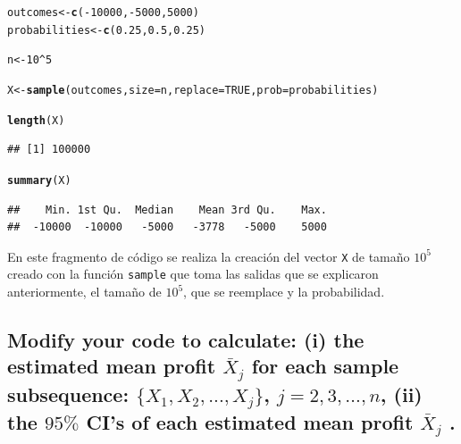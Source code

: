 \documentclass[12pt]{article}\usepackage[]{graphicx}\usepackage[]{xcolor}
\makeatletter
\newcommand{\hlnum}[1]{\textcolor[rgb]{0.686,0.059,0.569}{#1}}%
\newcommand{\hlopt}[1]{\textcolor[rgb]{0,0,0}{#1}}%
\newcommand{\hldef}[1]{\textcolor[rgb]{0.345,0.345,0.345}{#1}}%
\newcommand{\hlkwb}[1]{\textcolor[rgb]{0.69,0.353,0.396}{#1}}%
\newcommand{\hlkwc}[1]{\textcolor[rgb]{0.333,0.667,0.333}{#1}}%
\newcommand{\hlkwd}[1]{\textcolor[rgb]{0.737,0.353,0.396}{\textbf{#1}}}%
\newenvironment{kframe}{%
 \def\at@end@of@kframe{}%
 \ifinner\ifhmode%
  \def\at@end@of@kframe{\end{minipage}}%
  \begin{minipage}{\columnwidth}%
 \fi\fi%
 \def\FrameCommand##1{\hskip\@totalleftmargin \hskip-\fboxsep
 \colorbox{shadecolor}{##1}\hskip-\fboxsep
     \hskip-\linewidth \hskip-\@totalleftmargin \hskip\columnwidth}%
 \MakeFramed {\advance\hsize-\width
   \@totalleftmargin\z@ \linewidth\hsize
   \@setminipage}}%
 {\par\unskip\endMakeFramed%
 \at@end@of@kframe}
\newenvironment{knitrout}{}{} %
\makeatother
\begin{document}
\begin{knitrout}
\color{fgcolor}\begin{kframe}
\begin{alltt}
\hldef{outcomes} \hlkwb{<-} \hlkwd{c}\hldef{(}\hlopt{-}\hlnum{10000}\hldef{,} \hlopt{-}\hlnum{5000}\hldef{,} \hlnum{5000}\hldef{)}
\hldef{probabilities} \hlkwb{<-} \hlkwd{c}\hldef{(}\hlnum{0.25}\hldef{,} \hlnum{0.5}\hldef{,} \hlnum{0.25}\hldef{)}

\hldef{n} \hlkwb{<-} \hlnum{10}\hlopt{^}\hlnum{5}

\hldef{X} \hlkwb{<-} \hlkwd{sample}\hldef{(outcomes,} \hlkwc{size} \hldef{= n ,} \hlkwc{replace} \hldef{=} \hlnum{TRUE}\hldef{,} \hlkwc{prob} \hldef{= probabilities)}

\hlkwd{length}\hldef{(X)}
\end{alltt}
\begin{verbatim}
## [1] 100000
\end{verbatim}
\begin{alltt}
\hlkwd{summary}\hldef{(X)}
\end{alltt}
\begin{verbatim}
##    Min. 1st Qu.  Median    Mean 3rd Qu.    Max. 
##  -10000  -10000   -5000   -3778   -5000    5000
\end{verbatim}
\end{kframe}
\end{knitrout}

En este fragmento de código se realiza la creación del vector \lstinline|X| de tamaño $10^{5}$ creado con la función \lstinline|sample| que toma las salidas que se explicaron anteriormente, el tamaño de $10^{5}$, que se reemplace y la probabilidad.


\subsection{Modify your code to calculate: (i) the estimated mean profit $\bar{X}_{j}$ for each sample subsequence: $\{X_{1}, X_{2}, . . . , X_{j} \}$, $j = 2, 3, \dots, n$, (ii) the $95 \%$ CI’s of each estimated mean profit $\bar{X}_{j}$ .}
\end{document}
